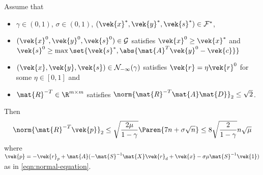\begin{lemma}\label{thm:initial-residual-bound}
  Assume that
  \begin{itemize}
    \item \(\gamma \in (0, 1)\), \(\sigma \in (0, 1)\), \((\vek{x}^*, \vek{y}^*, \vek{s}^*) \in \mathcal{F}^*\),
    \item \((\vek{x}^0, \vek{y}^0, \vek{s}^0) \in \mathcal{G}\) satisfies \(\vek{x}^0 \geq \vek{x}^*\) and \(\vek{s}^0 \geq \max\set{\vek{s}^*, \abs{\mat{A}^T\vek{y}^0 - \vek{c}}}\)
    \item \((\vek{x}, \vek{y}, \vek{s}) \in \mathcal{N}_{-\infty}(\gamma)\) satisfies \(\vek{r} = \eta \vek{r}^0\) for some \(\eta \in [0, 1]\) and
    \item \(\mat{R}^{-T} \in \R^{m \times m}\) satisfies \(\norm{\mat{R}^{-T}\mat{A}\mat{D}}_2 \leq \sqrt{2}\).
  \end{itemize}
  Then
  \[ \norm{\mat{R}^{-T} \vek{p}}_2 \leq \sqrt{\frac{2 \mu}{1 - \gamma}} \Paren{7n + \sigma \sqrt{n}} \leq 8 \sqrt{\frac{2}{1 - \gamma}} n \sqrt{\mu} \]
  where \(\vek{p} = -\vek{r}_p + \mat{A} ( -\mat{S}^{-1} \mat{X} \vek{r}_d + \vek{x} - \sigma \mu \mat{S}^{-1} \vek{1} )\) as in \cref{eqn:normal-equation}.
\end{lemma}

